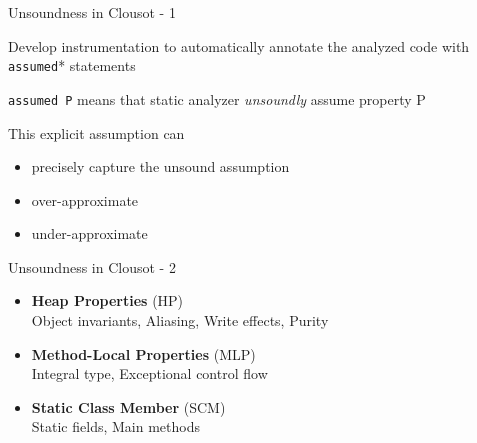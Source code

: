 \begin{frame}{Unsoundness in Clousot - 1}

\vspace*{-0.4cm}

Develop instrumentation to automatically annotate the analyzed code with
\texttt{assumed}* statements

\vspace*{0.6cm}

\texttt{assumed P} means that static analyzer \emph{unsoundly} assume property P

\vspace*{0.6cm}

This explicit assumption can
\begin{itemize}
  \item precisely capture the unsound assumption
  \item over-approximate
  \item under-approximate

\end{itemize}

\end{frame}



\begin{frame}{Unsoundness in Clousot - 2}

\vspace*{-0.4cm}

\begin{itemize}
  \item \textbf{Heap Properties} (HP)\\[0.1cm]
        Object invariants, Aliasing, Write effects, Purity

  \vfill

  \item \textbf{Method-Local Properties} (MLP)\\[0.1cm]
        Integral type, Exceptional control flow

  \vfill

  \item \textbf{Static Class Member} (SCM)\\[0.1cm]
        Static fields, Main methods
\end{itemize}

\end{frame}
